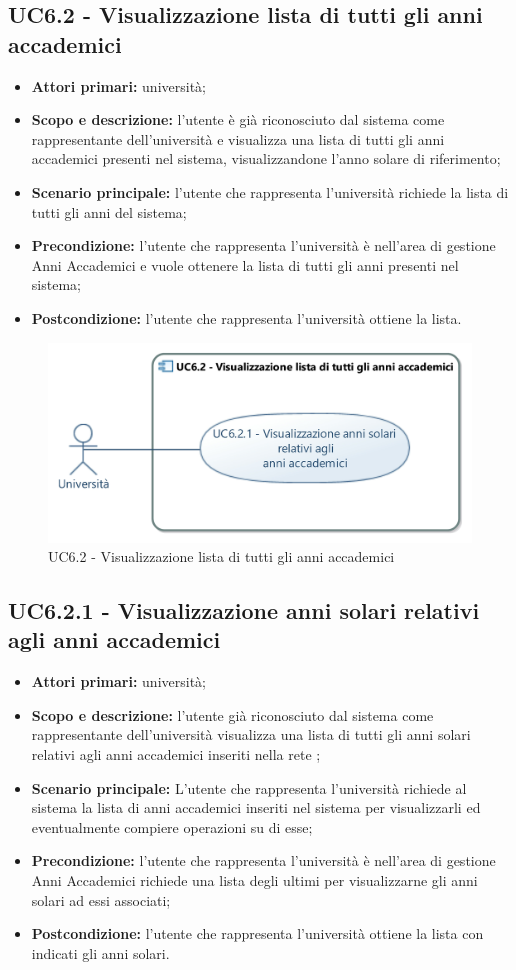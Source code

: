 \documentclass[AnalisiDeiRequisiti.tex]{subfiles}
\begin{document}
\subsection{UC6.2 - Visualizzazione lista di tutti gli anni accademici}
\begin{itemize}
	\item \textbf{Attori primari:} università;
	\item \textbf{Scopo e descrizione:} l'utente è già riconosciuto dal sistema come rappresentante dell'università e visualizza una lista di tutti gli anni accademici presenti nel sistema, visualizzandone l'anno solare di riferimento;
	\item \textbf{Scenario principale:} l'utente che rappresenta l'università richiede la lista di tutti gli anni del sistema;
	\item \textbf{Precondizione:} l'utente che rappresenta l'università è nell'area di gestione Anni Accademici e vuole ottenere la lista di tutti gli anni presenti nel sistema; 
	\item \textbf{Postcondizione:} l'utente che rappresenta l'università ottiene la lista.
\end{itemize}
\begin{figure}[H]
	\centering
	\includegraphics[width=0.7\linewidth]{UC6_2.jpg}
	\caption{UC6.2 - Visualizzazione lista di tutti gli anni accademici}
	\label{fig:UC6.2 - Visualizzazione lista di tutti gli anni accademici}
\end{figure}
\subsection{UC6.2.1 - Visualizzazione anni solari relativi agli anni accademici}
\begin{itemize}
	\item \textbf{Attori primari:} università;
	\item \textbf{Scopo e descrizione:} l'utente già riconosciuto dal sistema come rappresentante dell'università visualizza una lista di tutti gli anni solari relativi agli anni accademici inseriti nella rete ;
	\item \textbf{Scenario principale:} L'utente che rappresenta l'università richiede al sistema la lista di anni accademici inseriti nel sistema per visualizzarli ed eventualmente compiere operazioni su di esse;
	\item \textbf{Precondizione:} l'utente che rappresenta l'università è nell'area di gestione Anni Accademici richiede una lista degli ultimi per visualizzarne gli anni solari ad essi associati; 
	\item \textbf{Postcondizione:} l'utente che rappresenta l'università ottiene la lista con indicati gli anni solari.
\end{itemize}
\end{document}

